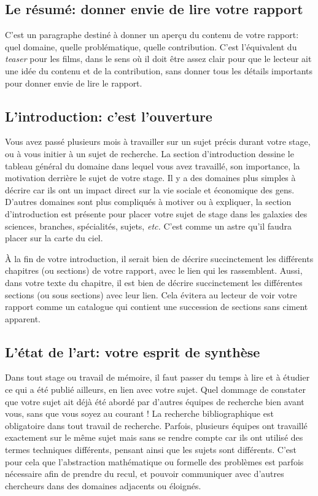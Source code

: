 \documentclass{rapport}
\def\etc{\textit{etc.}\xspace}
\begin{document}
      \subsection{Le résumé: donner envie de lire votre rapport} 
        C'est un paragraphe destiné à donner un aperçu du contenu de votre rapport: quel domaine, quelle problématique, quelle contribution. C'est l'équivalent du {\it teaser} pour les films, dans le sens où il doit être assez clair pour que le lecteur ait une idée du contenu et de la contribution, sans donner tous les détails importants pour  donner envie de lire le rapport.
      
      \subsection{L'introduction: c'est l'ouverture} 
        Vous avez passé plusieurs mois à travailler sur un sujet précis durant votre stage, ou à vous initier à un sujet de recherche. La section d'introduction dessine le tableau général du domaine dans lequel vous avez travaillé, son importance, la motivation derrière le sujet de votre stage. Il y a des domaines plus simples à décrire car ils ont un impact direct sur la vie sociale et économique des gens. D'autres domaines sont plus compliqués à motiver ou à expliquer, la section d'introduction est présente pour placer votre sujet de stage dans les galaxies des sciences, branches, spécialités, sujets, \etc C'est comme un astre qu'il faudra placer sur la carte du ciel.
        
        À la fin de votre introduction, il serait bien de décrire succinctement les différents chapitres (ou sections) de votre rapport, avec le lien qui les rassemblent. Aussi, dans votre texte du chapitre, il est bien de décrire succinctement les différentes sections (ou sous sections) avec leur lien. Cela évitera au lecteur de voir votre rapport comme un catalogue qui contient une succession de sections sans ciment apparent.

      \subsection{L'état de l'art: votre esprit de synthèse} 
        Dans tout stage ou travail de mémoire, il faut passer du temps à lire et à étudier ce qui a été publié ailleurs, en lien avec votre sujet. Quel dommage de constater que votre sujet ait déjà été abordé par d'autres équipes de recherche bien avant vous, sans que vous soyez au courant ! La recherche bibliographique est obligatoire dans tout travail de recherche. Parfois, plusieurs équipes ont travaillé exactement sur le même sujet mais sans se rendre compte car ils ont utilisé des termes techniques différents, pensant ainsi que les sujets sont différents. C'est pour cela que l'abstraction mathématique ou formelle des problèmes est parfois nécessaire afin de prendre du recul, et pouvoir communiquer avec d'autres chercheurs dans des domaines adjacents ou éloignés.
\end{document}
